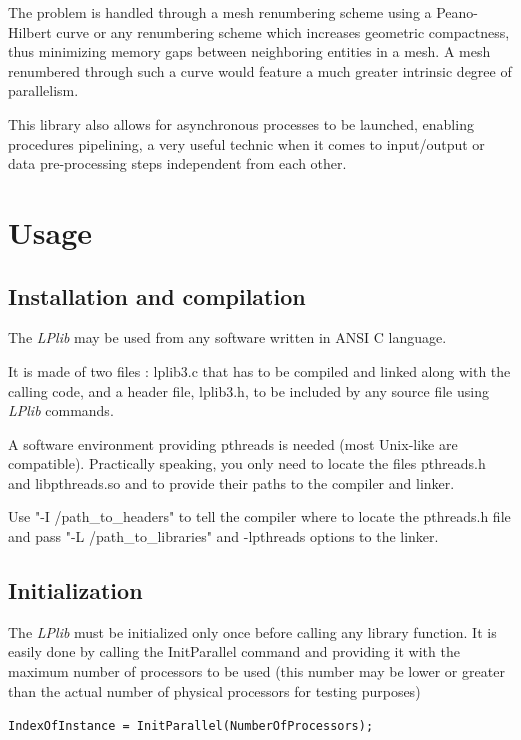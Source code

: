 \documentclass[a4paper,12pt]{article}
\begin{document}
The problem is handled through a mesh renumbering scheme using a Peano-Hilbert curve \cite{peano_hilbert} or any renumbering scheme which increases geometric compactness, thus minimizing memory gaps between neighboring entities in a mesh. A mesh renumbered through such a curve would feature a much greater intrinsic degree of parallelism.

This library also allows for asynchronous processes to be launched, enabling procedures pipelining, a very useful technic when it comes to input/output or data pre-processing steps independent from each other.


%
%

\section{Usage}

\subsection{Installation and compilation}

The \emph{LPlib} may be used from any software written in ANSI C language.

It is made of two files : lplib3.c that has to be compiled and linked along with the calling code, and a header file, lplib3.h, to be included by any source file using \emph{LPlib} commands.

A software environment providing pthreads is needed (most Unix-like are compatible). Practically speaking, you only need to locate the files pthreads.h and libpthreads.so and to provide their paths to the compiler and linker.

Use "-I /path\_to\_headers" to tell the compiler where to locate the pthreads.h file and pass "-L /path\_to\_libraries" and -lpthreads options to the linker.


\subsection{Initialization}

The \emph{LPlib} must be initialized only once before calling any library function. It is easily done by calling the InitParallel command and providing it with the maximum number of processors to be used (this number may be lower or greater than the actual number of physical processors for testing purposes)

\medskip
\tt{IndexOfInstance = InitParallel(NumberOfProcessors);}
\normalfont
\medskip
\end{document}
